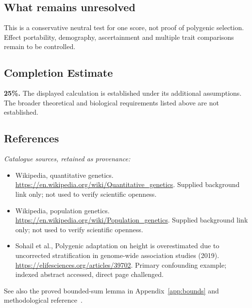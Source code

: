 \documentclass[11pt]{article}
\begin{document}
\subsection{What remains unresolved}
This is a conservative neutral test for one score, not proof of polygenic selection. Effect portability, demography, ascertainment and multiple trait comparisons remain to be controlled.
\subsection{Completion Estimate}
\textbf{25\%.} The displayed calculation is established under its additional assumptions. The broader theoretical and biological requirements listed above are not established.
\subsection{References}
\noindent\emph{Catalogue sources, retained as provenance:}
\begin{itemize}
\item Wikipedia, quantitative genetics. \url{https://en.wikipedia.org/wiki/Quantitative_genetics}. Supplied background link only; not used to verify scientific openness.
\item Wikipedia, population genetics. \url{https://en.wikipedia.org/wiki/Population_genetics}. Supplied background link only; not used to verify scientific openness.
\item Sohail et al., Polygenic adaptation on height is overestimated due to uncorrected stratification in genome-wide association studies (2019). \url{https://elifesciences.org/articles/39702}. Primary confounding example; indexed abstract accessed, direct page challenged.
\end{itemize}
\noindent See also the proved bounded-sum lemma in Appendix~\ref{app:bounds} and methodological reference~\cite{hoeffding}.
\clearpage


\appendix
\end{document}
